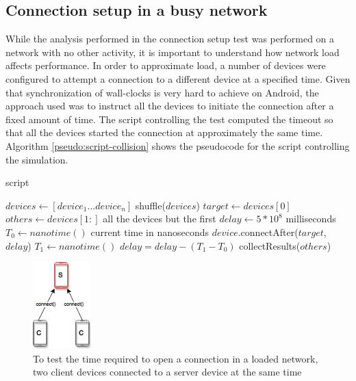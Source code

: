 \subsection{Connection setup in a busy network}
While the analysis performed in the connection setup test was performed on a network with no other activity, it is important to understand how network load affects performance.
In order to approximate load, a number of devices were configured to attempt a connection to a different device at a specified time.
Given that synchronization of wall-clocks is very hard to achieve on Android, the approach used was to instruct all the devices to initiate the connection after a fixed amount of time.
The script controlling the test computed the timeout so that all the devices started the connection at approximately the same time. 
Algorithm \ref{pseudo:script-collision} shows the pseudocode for the script controlling the simulation.

\begin{algorithm}
	\begin{algorithmic}[1]
  		\caption{script}
  		\label{pseudo:script-collision}
  		\State $devices \leftarrow [device_1 \dots device_n]$
  		\State shuffle($devices$)
  		\State $target \leftarrow devices[0]$
  		\State $others \leftarrow devices[1\colon]$ \Comment all the devices but the first
  		\State $delay \leftarrow 5 * 10^{8}$  milliseconds
		    \State $T_0 \leftarrow nanotime()$ \Comment current time in nanoseconds
		    \State $device$.connectAfter($target$, $delay$)
			\State $T_1 \leftarrow nanotime()$
			\State $delay = delay - (T_1 - T_0)$
		\EndFor
		\State \Return collectResults($others$)
  	\end{algorithmic}
\end{algorithm}

\begin{figure}[ht!]
  \centering
  \includegraphics[width=0.2\textwidth]{application/img/collision.png} 
  \caption{To test the time required to open a connection in a loaded network, two client devices connected to a server device at the same time}
  \label{figure:collision}
\end{figure}

